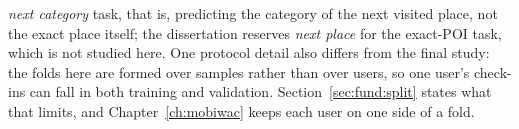 \begin{chapterpreface}
\emph{next category} task, that is, predicting the category of the next visited place,
not the exact place itself; the dissertation reserves \emph{next place} for the
exact-POI task, which is not studied here.
One protocol detail also differs from the final study: the folds here are formed over
samples rather than over users, so one user's check-ins can fall in both training and
validation. Section~\ref{sec:fund:split} states what that limits, and
Chapter~\ref{ch:mobiwac} keeps each user on one side of a fold.

\end{chapterpreface}
